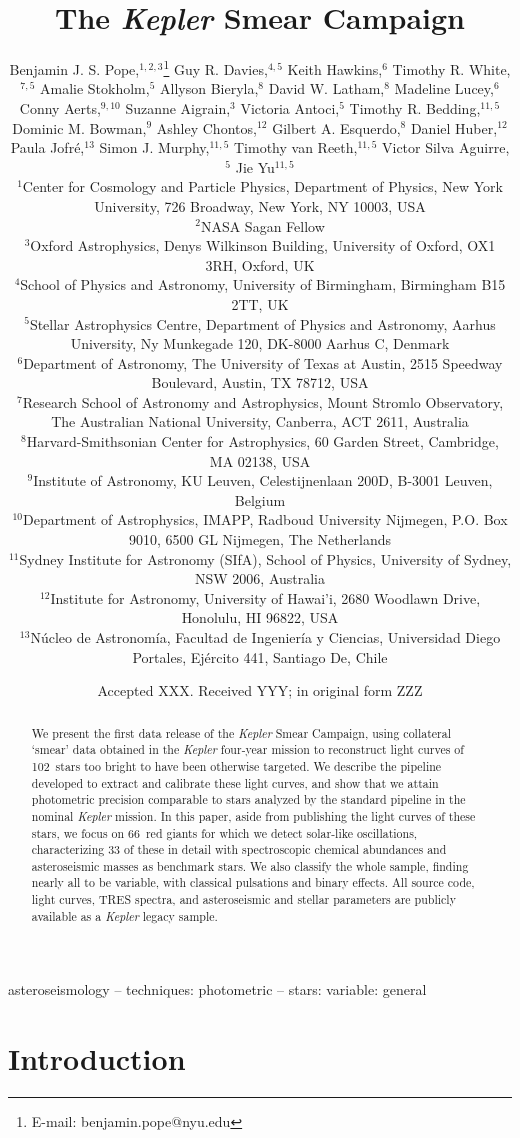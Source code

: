 \documentclass[a4paper,fleqn,usenatbib]{mnras}
\title[The Kepler Smear Campaign]{The \textit{Kepler} Smear Campaign}
\author[B. J. S. Pope et al.]{Benjamin J. S. Pope,$^{1,2,3}$\thanks{E-mail: benjamin.pope@nyu.edu}
Guy R. Davies,$^{4,5}$
Keith Hawkins,$^{6}$
Timothy R. White,$^{7,5}$\newauthor
Amalie Stokholm,$^{5}$
Allyson Bieryla,$^{8}$
David W. Latham,$^{8}$
Madeline Lucey,$^{6}$\newauthor
Conny Aerts,$^{9,10}$
Suzanne Aigrain,$^{3}$ 
Victoria Antoci,$^{5}$
Timothy R. Bedding,$^{11,5}$\newauthor
Dominic M. Bowman,$^{9}$
Ashley Chontos,$^{12}$
Gilbert A. Esquerdo,$^{8}$
Daniel Huber,$^{12}$\newauthor
Paula Jofr\'{e},$^{13}$
Simon J. Murphy,$^{11,5}$
Timothy van Reeth,$^{11,5}$
Victor Silva Aguirre,$^{5}$\newauthor
Jie Yu$^{11,5}$ 
\\
$^{1}$Center for Cosmology and Particle Physics, Department of Physics, New York University, 726 Broadway, New York, NY 10003, USA\\
$^{2}$NASA Sagan Fellow\\
$^{3}$Oxford Astrophysics, Denys Wilkinson Building, University of Oxford, OX1 3RH, Oxford, UK\\
$^{4}$School of Physics and Astronomy, University of Birmingham, Birmingham B15 2TT, UK\\
$^{5}$Stellar Astrophysics Centre, Department of Physics and Astronomy, Aarhus University, Ny Munkegade 120, DK-8000 Aarhus C, Denmark\\
$^{6}$Department of Astronomy, The University of Texas at Austin, 2515 Speedway Boulevard, Austin, TX 78712, USA\\
$^{7}$Research School of Astronomy and Astrophysics, Mount Stromlo Observatory, The Australian National University, Canberra, ACT 2611, Australia\\
$^{8}$Harvard-Smithsonian Center for Astrophysics, 60 Garden Street, Cambridge, MA 02138, USA\\
$^{9}$Institute of Astronomy, KU Leuven, Celestijnenlaan 200D, B-3001 Leuven, Belgium\\
$^{10}$Department of Astrophysics, IMAPP, Radboud University Nijmegen, P.O. Box 9010, 6500 GL Nijmegen, The Netherlands\\
$^{11}$Sydney Institute for Astronomy (SIfA), School of Physics, University of Sydney, NSW 2006, Australia\\
$^{12}$Institute for Astronomy, University of Hawai'i, 2680 Woodlawn Drive, Honolulu, HI 96822, USA\\
$^{13}$N\'{u}cleo de Astronom\'{i}a, Facultad de Ingenier\'{i}a y Ciencias, Universidad Diego Portales, Ej\'{e}rcito 441, Santiago De, Chile\\
}
\date{Accepted XXX. Received YYY; in original form ZZZ}
\newcommand{\kepler}{\textit{Kepler}\xspace}
\begin{document}
\label{firstpage}
\pagerange{\pageref{firstpage}--\pageref{lastpage}}
\maketitle

\begin{abstract}
We present the first data release of the \kepler Smear Campaign, using collateral `smear' data obtained in the \kepler four-year mission to reconstruct light curves of 102~stars too bright to have been otherwise targeted. We describe the pipeline developed to extract and calibrate these light curves, and show that we attain photometric precision comparable to stars analyzed by the standard pipeline in the nominal \kepler mission. In this paper, aside from publishing the light curves of these stars, we focus on 66~red giants for which we detect solar-like oscillations, characterizing 33 of these in detail with spectroscopic chemical abundances and asteroseismic masses as benchmark stars. We also classify the whole sample, finding nearly all to be variable, with classical pulsations and binary effects. All source code, light curves, TRES spectra, and asteroseismic and stellar parameters are publicly available as a \kepler legacy sample. \href{https://github.com/benjaminpope/smearcampaign}{\faGithub}
\end{abstract}

\begin{keywords}
asteroseismology -- techniques: photometric -- stars: variable: general
\end{keywords}



\section{Introduction}
\label{intro}

\end{document}
